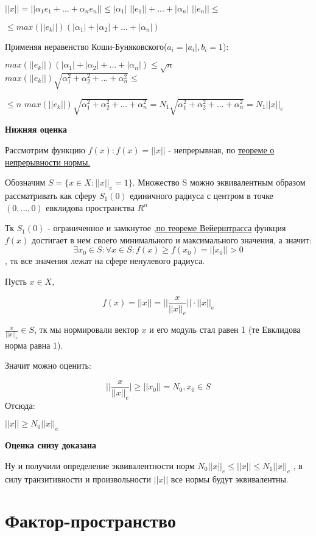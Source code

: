 \documentclass[12pt]{article}
\begin{document}
	$||x|| = || \alpha_1 e_1 + ... + \alpha_n e_n|| \leq |\alpha_1|$ $||e_1|| + ... + |\alpha_n|$ $||e_n|| \leq $
	
	$\leq max(||e_k||) (|\alpha_1| + |\alpha_2| + ...+ |\alpha_n|)$
	
	Применяя неравенство Коши-Буняковского($a_i = |a_i|, b_i = 1$):
			
	$max(||e_k||) (|\alpha_1| + |\alpha_2| + ...+ |\alpha_n|) \leq  \sqrt{n}$ $max(||e_k||)\sqrt{\alpha_1^2 + \alpha_2^2 + ... +\alpha_n^2  } \leq$
	
	$\leq n $ $max(||e_k||)\sqrt{\alpha_1^2 + \alpha_2^2 + ... +\alpha_n^2  } = N_1\sqrt{\alpha_1^2 + \alpha_2^2 + ... +\alpha_n^2  } = N_1 ||x||_e$

\textbf{Нижняя оценка}

		Рассмотрим функцию $f(x): f(x) = ||x||$ - непрерывная, по \hyperref[eq100]{теореме о непрерывности нормы.}
		
		 Обозначим $S = \{ x \in X : ||x||_e = 1 \}$. Множество S можно эквивалентным образом рассматривать как сферу $S_1(0)$ единичного радиуса с центром в
точке $(0,..., 0)$ евклидова пространства $R^n$

	Тк $S_1(0)$ - ограниченное и замкнутое ,\hyperref[eq202]{по теореме Вейерштрасса} функция $f(x)$ достигает в нем
	своего минимального и максимального значения, а значит:
	$$\exists x_0 \in S: \forall x \in S: f(x) \ge f(x_0) = ||x_0|| > 0$$, тк все значения лежат на сфере ненулевого радиуса.
		
		Пусть $x \in X$, 
		
		$$f(x) = ||x|| = ||\frac{x}{||x||_e}|| \cdot ||x||_e $$
		
		$\frac{x}{||x||_e} \in S$, тк мы нормировали вектор $x$ и его модуль стал равен 1 (те Евклидова норма равна 1).
		
	Значит можно оценить:
		 
	$$||\frac{x}{||x||_e}| \ge ||x_0|| = N_0, x_0 \in S$$
	Отсюда:
		 
	$||x|| \ge N_0 ||x||_e$
		 
 	\textbf{Оценка снизу доказана}
		
	Ну и получили определение эквивалентности норм
	$N_0||x||_e \leq ||x|| \leq N_1||x||_e$
	, в силу транзитивности и произвольности $||x||$ все нормы будут эквивалентны.

\newpage
\section{Фактор-пространство}
\end{document}
